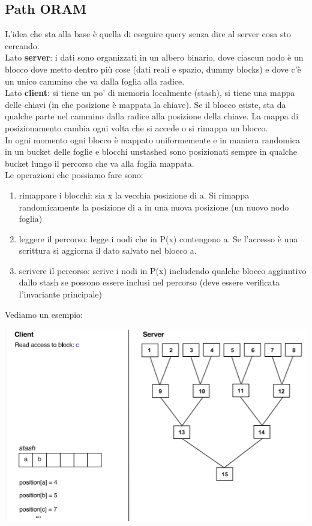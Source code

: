 \subsection{Path ORAM}
L'idea che sta alla base è quella di eseguire query senza dire al server cosa sto cercando. \\
Lato \textbf{server}: i dati sono organizzati in un albero binario, dove ciascun nodo è un blocco dove metto dentro più cose (dati reali e spazio, dummy blocks) e dove c’è un unico cammino che va dalla foglia alla radice.\\
Lato \textbf{client}: si tiene un po' di memoria localmente (stash), si tiene una mappa delle chiavi (in che posizione è mappata la chiave). Se il blocco esiste, sta da qualche parte nel cammino dalla radice alla posizione della chiave. La mappa di posizionamento cambia ogni volta che si accede o si rimappa un blocco.\\
In ogni momento ogni blocco è mappato uniformemente e in maniera randomica in un bucket delle foglie e blocchi unstashed sono posizionati sempre in qualche bucket lungo il percorso che va alla foglia mappata.\\
Le operazioni che possiamo fare sono:
\begin{enumerate}
    \item rimappare i blocchi: sia x la vecchia posizione di a. Si rimappa randomicamente la posizione di a in una nuova posizione (un nuovo nodo foglia)
    \item leggere il percorso: legge i nodi che in P(x) contengono a. Se l'accesso è una scrittura si aggiorna il dato salvato nel blocco a.
    \item scrivere il percorso: scrive i nodi in P(x) includendo qualche blocco aggiuntivo dallo stash se possono essere inclusi nel percorso (deve essere verificata l'invariante principale)
\end{enumerate}
Vediamo un esempio:
\begin{center}
    \includegraphics[scale=0.8]{img/poram.png}
\end{center}
